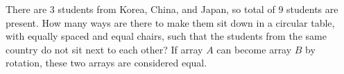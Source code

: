 There are $3$ students from Korea, China, and Japan, so total of $9$ students are present. How many ways are there to make them sit down in a circular table, with equally spaced and equal chairs, such that the students from the same country do not sit next to each other? If array $A$ can become array $B$ by rotation, these two arrays are considered equal.